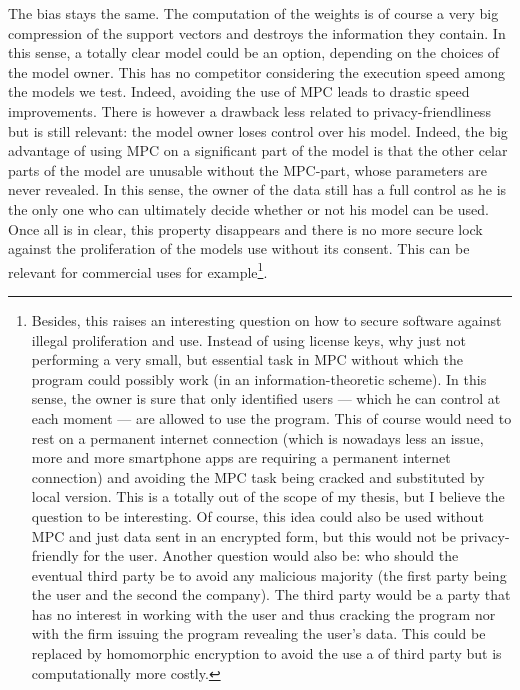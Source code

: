 \begin{itemize}
    The bias stays the same. The computation of the weights is of course a very big compression of the support vectors and destroys the information they contain. In this sense, a totally clear model could be an option, depending on the choices of the model owner. This has no competitor considering the execution speed among the models we test. Indeed, avoiding the use of MPC leads to drastic speed improvements. There is however a drawback less related to privacy-friendliness but is still relevant: the model owner loses control over his model. Indeed, the big advantage of using MPC on a significant part of the model is that the other celar parts of the model are unusable without the MPC-part, whose parameters are never revealed. In this sense, the owner of the data still has a full control as he is the only one who can ultimately decide whether or not his model can be used. Once all is in clear, this property disappears and there is no more secure lock against the proliferation of the models use without its consent. This can be relevant for commercial uses for example\footnote{Besides, this raises an interesting question on how to secure software against illegal proliferation and use. Instead of using license keys, why just not performing a very small, but essential task in MPC without which the program could possibly work (in an information-theoretic scheme). In this sense, the owner is sure that only identified users --- which he can control at each moment --- are allowed to use the program. This of course would need to rest on a permanent internet connection (which is nowadays less an issue, more and more smartphone apps are requiring a permanent internet connection) and avoiding the MPC task being cracked and substituted by local version. This is a totally out of the scope of my thesis, but I believe the question to be interesting. Of course, this idea could also be used without MPC and just data sent in an encrypted form, but this would not be privacy-friendly for the user. Another question would also be: who should the eventual third party be to avoid any malicious majority (the first party being the user and the second the company). The third party would be a party that has no interest in working with the user and thus cracking the program nor with the firm issuing the program revealing the user's data. This could be replaced by homomorphic encryption to avoid the use a of third party but is computationally more costly.}.
\end{itemize}



